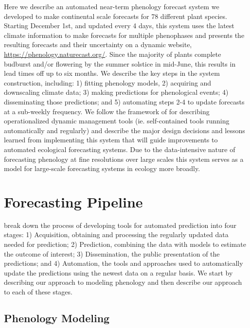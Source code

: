 Here we describe an automated near-term phenology forecast system we developed to make continental scale forecasts for 78 different plant species. Starting December 1st, and updated every 4 days, this system uses the latest climate information to make forecasts for multiple phenophases and presents the resulting forecasts and their uncertainty on a dynamic website, \href{https://phenology.naturecast.org/}{https://phenology.naturecast.org/}. Since the majority of plants complete budburst and/or flowering by the summer solstice in mid-June, this results in lead times off up to six months. We describe the key steps in the system construction, including: 1) fitting phenology models, 2) acquiring and downscaling climate data; 3) making predictions for phenological events; 4) disseminating those predictions; and 5) automating steps 2-4 to update forecasts at a sub-weekly frequency. We follow the framework of \cite{welch2019} for describing operationalized dynamic management tools (ie. self-contained tools running automatically and regularly) and describe the major design decisions and lessons learned from implementing this system that will guide improvements to automated ecological forecasting systems. Due to the data-intensive nature of forecasting phenology at fine resolutions over large scales this system serves as a model for large-scale forecasting systems in ecology more broadly. 

\section{Forecasting Pipeline}

\cite{welch2019} break down the process of developing tools for automated prediction into four stages: 1) Acquisition, obtaining and processing the regularly updated data needed for prediction; 2) Prediction, combining the data with models to estimate the outcome of interest; 3) Dissemination, the public presentation of the predictions; and 4) Automation, the tools and approaches used to automatically update the predictions using the newest data on a regular basis. We start by describing our approach to modeling phenology and then describe our approach to each of these stages.

\subsection{Phenology Modeling}

